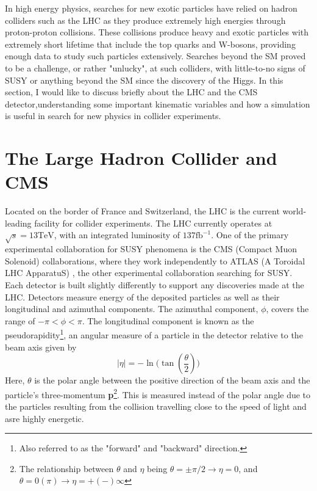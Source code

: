 In high energy physics, searches for new exotic particles have relied on hadron colliders such as the LHC as they produce extremely high energies through proton-proton collisions. These collisions produce heavy and exotic particles with extremely short lifetime that include the top quarks and W-bosons, providing enough data to study such particles extensively. Searches beyond the SM proved to be a  challenge, or rather "unlucky", at such colliders, with little-to-no signs of SUSY or anything beyond the SM since the discovery of the Higgs. In this section, I would like to discuss briefly about the LHC and the CMS detector,understanding some important kinematic variables and how a simulation is useful in search for new physics in collider experiments.

\section{The Large Hadron Collider and CMS}
\label{sec:Detector}
Located on the border of France and Switzerland, the LHC is the current world-leading facility for collider experiments. The LHC currently operates at $ \sqrt{s}=13 \text{TeV} $, with an integrated luminosity of $137\text{fb}^{-1}$. One of the primary experimental collaboration for SUSY phenomena is the CMS (Compact Muon Solenoid) \cite{chatrchyan2008cms} collaborations, where they work independently to ATLAS (A Toroidal LHC ApparatuS) \cite{collaboration2008atlas}, the other experimental collaboration searching for SUSY.  Each detector is built slightly differently to support any discoveries made at the LHC. Detectors measure energy of the deposited particles as well as their longitudinal and azimuthal components. The azimuthal component, $\phi$, covers the range of $-\pi < \phi < \pi$. The longitudinal component is known as the pseudorapidity\footnote{Also referred to as the "forward" and "backward" direction.}, an angular measure of a particle in the detector relative to the beam axis given by
\begin{equation}
    |\eta|=-\ln\Big(\tan(\frac{\theta}{2})\Big)
    \label{eq:eta}
\end{equation}
Here, $\theta$ is the polar angle between the positive direction of the beam axis and the particle's three-momentum \textbf{p}\footnote{The relationship between $\theta$ and $\eta$ being $\theta = \pm \pi/2 \rightarrow \eta = 0$, and $\theta = 0(\pi) \rightarrow \eta = +(-) \infty$}. This is measured instead of the polar angle due to the particles resulting from the collision travelling close to the speed of light and asre highly energetic. \\

